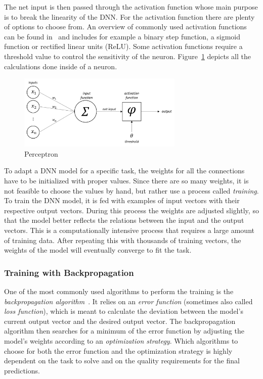 The net input is then passed through the activation function whose main purpose is to break the linearity of the DNN. For the activation function there are plenty of options to choose from. An overview of commonly used activation functions can be found in~\cite{act_funcs18} and includes for example a binary step function, a sigmoid function or rectified linear units (ReLU). Some activation functions require a threshold value to control the sensitivity of the neuron. Figure~\ref{fig:perceptron} depicts all the calculations done inside of a neuron.

\begin{figure}[h]
    \centering
    \includegraphics[width=0.7\textwidth]{images/perceptron}
    \caption{Perceptron}
    \label{fig:perceptron}
\end{figure}

To adapt a DNN model for a specific task, the weights for all the connections have to be initialized with proper values. Since there are so many weights, it is not feasible to choose the values by hand, but rather use a process called \emph{training}. To train the DNN model, it is fed with examples of input vectors with their respective output vectors. During this process the weights are adjusted slightly, so that the model better reflects the relations between the input and the output vectors. This is a computationally intensive process that requires a large amount of training data. After repeating this with thousands of training vectors, the weights of the model will eventually converge to fit the task.

\subsubsection{Training with Backpropagation}
One of the most commonly used algorithms to perform the training is the \emph{backpropagation algorithm}~\cite[pp.~151ff]{nn_intro96}. It relies on an \emph{error function} (sometimes also called \emph{loss function}), which is meant to calculate the deviation between the model's current output vector and the desired output vector. The backpropagation algorithm then searches for a minimum of the error function by adjusting the model's weights according to an \emph{optimization strategy}. Which algorithms to choose for both the error function and the optimization strategy is highly dependent on the task to solve and on the quality requirements for the final predictions.

